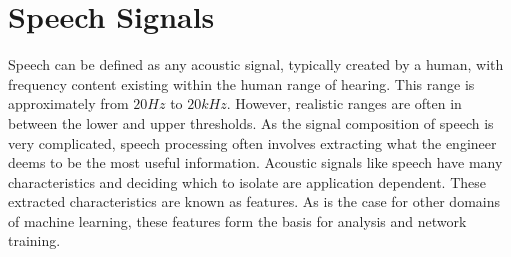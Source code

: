\section{Speech Signals}
Speech can be defined as any acoustic signal, typically created by a human, with frequency content existing within the human range of hearing. This range is approximately from $20Hz$ to $20kHz$. However, realistic ranges are often in between the lower and upper thresholds. As the signal composition of speech is very complicated, speech processing often involves extracting what the engineer deems to be the most useful information. Acoustic signals like speech have many characteristics and deciding which to isolate are application dependent. These extracted characteristics are known as features. As is the case for other domains of machine learning, these features form the basis for analysis and network training. 

